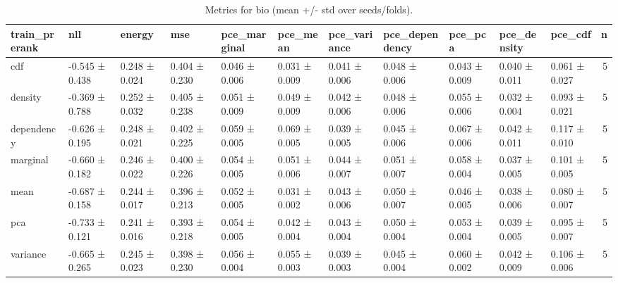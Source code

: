 \begin{table}
\caption{Metrics for bio (mean +/- std over seeds/folds).}
\label{tab:metrics_summary_bio}
\begin{tabular}{lllllllllllr}
\toprule
train_prerank & nll & energy & mse & pce_marginal & pce_mean & pce_variance & pce_dependency & pce_pca & pce_density & pce_cdf & n \\
\midrule
cdf & -0.545 ± 0.438 & 0.248 ± 0.024 & 0.404 ± 0.230 & 0.046 ± 0.006 & 0.031 ± 0.009 & 0.041 ± 0.006 & 0.048 ± 0.006 & 0.043 ± 0.009 & 0.040 ± 0.011 & 0.061 ± 0.027 & 5 \\
density & -0.369 ± 0.788 & 0.252 ± 0.032 & 0.405 ± 0.238 & 0.051 ± 0.009 & 0.049 ± 0.009 & 0.042 ± 0.006 & 0.048 ± 0.006 & 0.055 ± 0.006 & 0.032 ± 0.004 & 0.093 ± 0.021 & 5 \\
dependency & -0.626 ± 0.195 & 0.248 ± 0.021 & 0.402 ± 0.225 & 0.059 ± 0.005 & 0.069 ± 0.005 & 0.039 ± 0.005 & 0.045 ± 0.006 & 0.067 ± 0.006 & 0.042 ± 0.011 & 0.117 ± 0.010 & 5 \\
marginal & -0.660 ± 0.182 & 0.246 ± 0.022 & 0.400 ± 0.226 & 0.054 ± 0.005 & 0.051 ± 0.006 & 0.044 ± 0.007 & 0.051 ± 0.007 & 0.058 ± 0.004 & 0.037 ± 0.005 & 0.101 ± 0.005 & 5 \\
mean & -0.687 ± 0.158 & 0.244 ± 0.017 & 0.396 ± 0.213 & 0.052 ± 0.005 & 0.031 ± 0.002 & 0.043 ± 0.006 & 0.050 ± 0.007 & 0.046 ± 0.005 & 0.038 ± 0.006 & 0.080 ± 0.007 & 5 \\
pca & -0.733 ± 0.121 & 0.241 ± 0.016 & 0.393 ± 0.218 & 0.054 ± 0.005 & 0.042 ± 0.004 & 0.043 ± 0.004 & 0.050 ± 0.004 & 0.053 ± 0.004 & 0.039 ± 0.005 & 0.095 ± 0.007 & 5 \\
variance & -0.665 ± 0.265 & 0.245 ± 0.023 & 0.398 ± 0.230 & 0.056 ± 0.004 & 0.055 ± 0.003 & 0.039 ± 0.003 & 0.045 ± 0.004 & 0.060 ± 0.002 & 0.042 ± 0.009 & 0.106 ± 0.006 & 5 \\
\bottomrule
\end{tabular}
\end{table}
